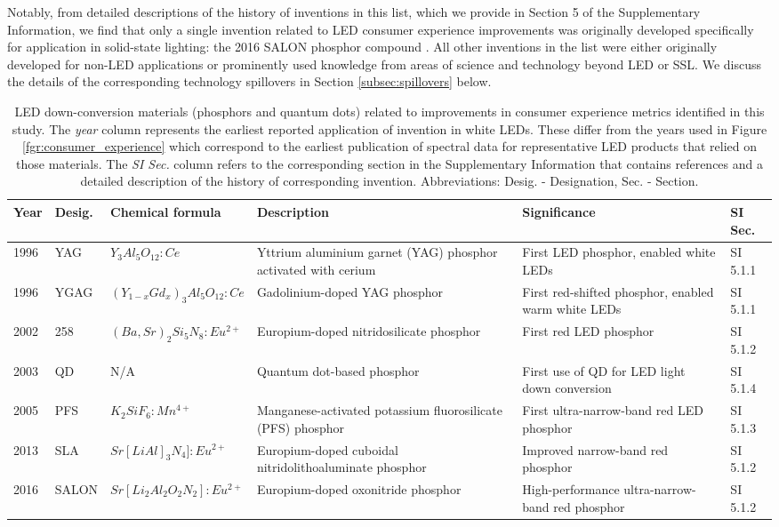 \documentclass[twoside,twocolumn,9pt]{article}
\begin{document}
Notably, from detailed descriptions of the history of inventions in this list, which we provide in Section 5 of the Supplementary Information, we find that only a single invention related to LED consumer experience improvements was originally developed specifically for application in solid-state lighting: the 2016 SALON phosphor compound \cite{seibald2019phosphor}\cite{Hoerder2019}. All other inventions in the list were either originally developed for non-LED applications or prominently used knowledge from areas of science and technology beyond LED or SSL. We discuss the details of the corresponding technology spillovers in Section \ref{subsec:spillovers} below. 

\begin{table}[h!]
    \small
    \centering
    \begin{tabularx}{\textwidth}{|l|l|l|X|X|l|}
    \hline
        \textbf{Year} & \textbf{Desig.} & \textbf{Chemical formula} & \textbf{Description} & \textbf{Significance} & \textbf{SI Sec.} \\ \hline
        1996 & YAG & $Y_3 Al_5 O_{12}:Ce$ & Yttrium aluminium garnet (YAG) phosphor activated with cerium & First LED phosphor, enabled white LEDs & SI 5.1.1 \\ \hline
        1996 & YGAG & $(Y_{1-x} Gd_x)_3 Al_5 O_{12}:Ce$ & Gadolinium-doped YAG phosphor & First red-shifted phosphor, enabled warm white LEDs & SI 5.1.1 \\ \hline
        2002 & 258 & $(Ba,Sr)_2 Si_5 N_8:Eu^{2+}$ & Europium-doped nitridosilicate phosphor & First red LED phosphor & SI 5.1.2 \\ \hline
        2003 & QD & N/A & Quantum dot-based phosphor & First use of QD for LED light down conversion & SI 5.1.4 \\ \hline
        2005 & PFS & $K_2 SiF_6: Mn^{4+}$ & Manganese-activated potassium fluorosilicate (PFS) phosphor & First ultra-narrow-band red LED phosphor & SI 5.1.3 \\ \hline
        2013 & SLA & $Sr[Li Al]_3 N_4 ]:Eu^{2+}$ & Europium-doped cuboidal nitridolithoaluminate phosphor & Improved narrow-band red phosphor & SI 5.1.2 \\ \hline
        2016 & SALON & $Sr[Li_2 Al_2 O_2 N_2]:Eu^{2+}$ & Europium-doped oxonitride phosphor & High-performance ultra-narrow-band red phosphor & SI 5.1.2 \\ \hline
    \end{tabularx}
    \caption{LED down-conversion materials (phosphors and quantum dots) related to improvements in consumer experience metrics identified in this study. The \textit{year} column represents the earliest reported application of invention in white LEDs. These differ from the years used in Figure \ref{fgr:consumer_experience} which correspond to the earliest publication of spectral data for representative LED products that relied on those materials. The \textit{SI Sec.} column refers to the corresponding section in the Supplementary Information that contains references and a detailed description of the history of corresponding invention. Abbreviations: Desig. - Designation, Sec. - Section.}
    \label{tab:phosphors}
\end{table}
\end{document}
